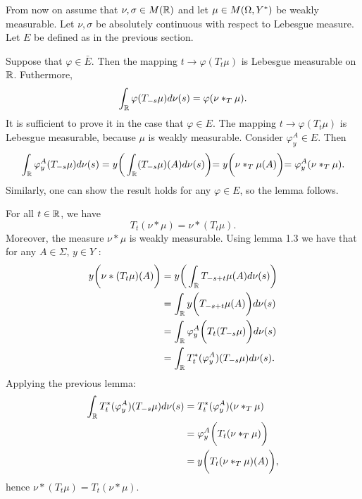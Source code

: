  From  now on assume that  $\nu, \sigma \in M(\Bbb R)$ and let
$ \mu \in M(\Omega, Y^*) $ be weakly measurable.
 Let $\nu, \sigma$ be absolutely continuous with respect to
Lebesgue measure.
Let $E$ be defined as in the previous section.

Suppose
that $\varphi \in \bar E$.
Then the mapping $t\to \varphi (T_t \mu)$ is
Lebesgue measurable on $\Bbb R$. Futhermore,
$$\int_{\Bbb R} \varphi (T_{-s}\mu) d\nu(s) = \varphi (\nu \ast_T  \mu
).$$\endproclaim
 \prf
It is sufficient to prove it in the case that $\varphi \in E$.
The mapping $t\to \varphi (T_t \mu)$  is Lebesgue measurable,
because $\mu$ is
weakly measurable.
   Consider $\varphi_y^A \in E$. Then
$$\int_{\Bbb R} \varphi_y^A (T_{-s}\mu) d\nu(s)
=y\biggr(\int_{\Bbb R}  (T_{-s}\mu)(A) d\nu(s)\biggl)
= y\biggr(\nu \ast_T  \mu (A)\biggl)
   = \varphi_y^A (\nu \ast_T  \mu  ).$$
Similarly, one can show the result holds for any $ \varphi \in E$,
so the lemma
follows.\endprf


   For all $t\in \Bbb R$, we have
$$ T_t(\nu  \ast \mu) = \nu \ast (T_t\mu).$$
Moreover, the measure $\nu  \ast \mu$ is weakly measurable.
\endproclaim
\prf   Using lemma 1.3 we have that for any $A\in \Sigma , \, y\in Y$ :
$$\split y \biggr( \nu \ast (T_t\mu)(A)\biggl)&
=y\biggr(\int_{\R} T_{-s+t} \mu(A) d\nu (s)\biggl)\\
& = \int_{\R}  y\biggr(  T_{-s+t} \mu(A)\biggl)  d\nu (s) \\
&= \int_{\R} \varphi_y^A \biggr( T_t (T_{-s}\mu )\biggl) d\nu(s)\\
&=\int_{\R} T_t^* (\varphi_y^A) (T_{-s}\mu) d\nu (s).\endsplit$$
Applying the previous lemma:
$$\split \int_{\R} T_t^* (\varphi_y^A) (T_{-s}\mu) d\nu (s)
&=T_t^* (\varphi_y^A) (\nu \ast_T \mu )\\
&= \varphi_y^A \biggr(T_t( \nu \ast_T \mu )\biggl)\\
& = y\biggr(T_t (\nu\ast_T \mu) (A) \biggl),\endsplit$$
hence $\nu \ast (T_t \mu) = T_t (\nu \ast \mu).$

